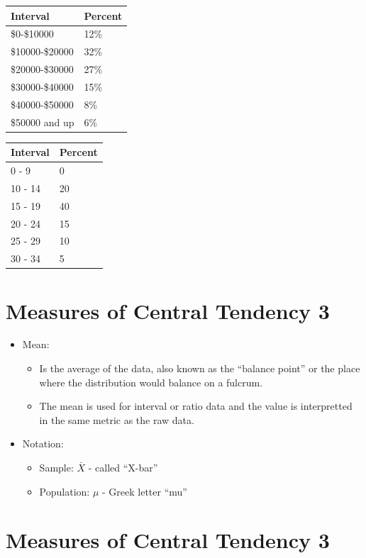 \documentclass[12pt]{article}
\begin{document}
\begin{multicols}{2}
\begin{longtable}[c]{@{}ll@{}}
\toprule
Interval & Percent\tabularnewline
\midrule
\endhead
\$0-\$10000 & 12\%\tabularnewline
\$10000-\$20000 & 32\%\tabularnewline
\$20000-\$30000 & 27\%\tabularnewline
\$30000-\$40000 & 15\%\tabularnewline
\$40000-\$50000 & 8\%\tabularnewline
\$50000 and up & 6\%\tabularnewline
\bottomrule
\end{longtable}

\columnbreak
\begin{longtable}[c]{@{}ll@{}}
\toprule
Interval & Percent\tabularnewline
\midrule
\endhead
0 - 9 & 0\tabularnewline
10 - 14 & 20\tabularnewline
15 - 19 & 40\tabularnewline
20 - 24 & 15\tabularnewline
25 - 29 & 10\tabularnewline
30 - 34 & 5\tabularnewline
\bottomrule
\end{longtable}
\end{multicols}

\newpage
\section{Measures of Central Tendency
3}\label{measures-of-central-tendency-3}

\begin{itemize}
\itemsep1pt\parskip0pt
\item
  Mean:

  \begin{itemize}
  \itemsep1pt\parskip0pt
  \item
    Is the average of the data, also known as the ``balance point'' or
    the place where the distribution would balance on a fulcrum.
  \item
    The mean is used for interval or ratio data and the value is
    interpretted in the same metric as the raw data.
  \end{itemize}
\item
  Notation:

  \begin{itemize}
  \itemsep1pt\parskip0pt
  \item
    Sample: \(\bar{X}\) - called ``X-bar''
  \item
    Population: \(\mu\) - Greek letter ``mu''
  \end{itemize}
\end{itemize}

\section{Measures of Central Tendency
3}\label{measures-of-central-tendency-3-1}
\end{document}
